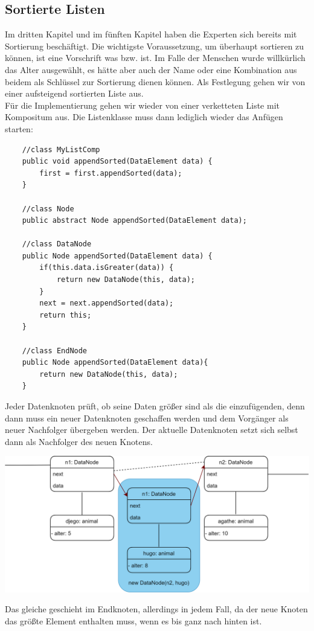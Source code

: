 \documentclass{article}
\begin{document}
\subsection{Sortierte Listen}
Im dritten Kapitel und im fünften Kapitel haben die Experten sich bereits mit Sortierung beschäftigt. Die wichtigste Voraussetzung, um überhaupt sortieren zu können, ist eine Vorschrift was  bzw.  ist. Im Falle der Menschen wurde willkürlich das Alter ausgewählt, es hätte aber auch der Name oder eine Kombination aus beidem als Schlüssel zur Sortierung dienen können. Als Festlegung gehen wir von einer aufsteigend sortierten Liste aus. \\
Für die Implementierung gehen wir wieder von einer verketteten Liste mit Kompositum aus. Die Listenklasse muss dann lediglich wieder das Anfügen starten: 
\begin{verbatim}
    //class MyListComp
    public void appendSorted(DataElement data) {
        first = first.appendSorted(data);
    }

    //class Node 
    public abstract Node appendSorted(DataElement data);

    //class DataNode 
    public Node appendSorted(DataElement data) {
        if(this.data.isGreater(data)) {
            return new DataNode(this, data);
        }
        next = next.appendSorted(data);
        return this;
    }

    //class EndNode
    public Node appendSorted(DataElement data){
        return new DataNode(this, data);
    }
\end{verbatim}
Jeder Datenknoten prüft, ob seine Daten größer sind als die einzufügenden, denn dann muss ein neuer Datenknoten geschaffen werden und dem Vorgänger als neuer Nachfolger übergeben werden. Der aktuelle Datenknoten setzt sich selbst dann als Nachfolger des neuen Knotens. \\
\begin{center}
    \includegraphics[scale=0.2]{../media/append_sorted_objects.png}   
\end{center}
Das gleiche geschieht im Endknoten, allerdings in jedem Fall, da der neue Knoten das größte Element enthalten muss, wenn es bis ganz nach hinten  ist.
\end{document}
